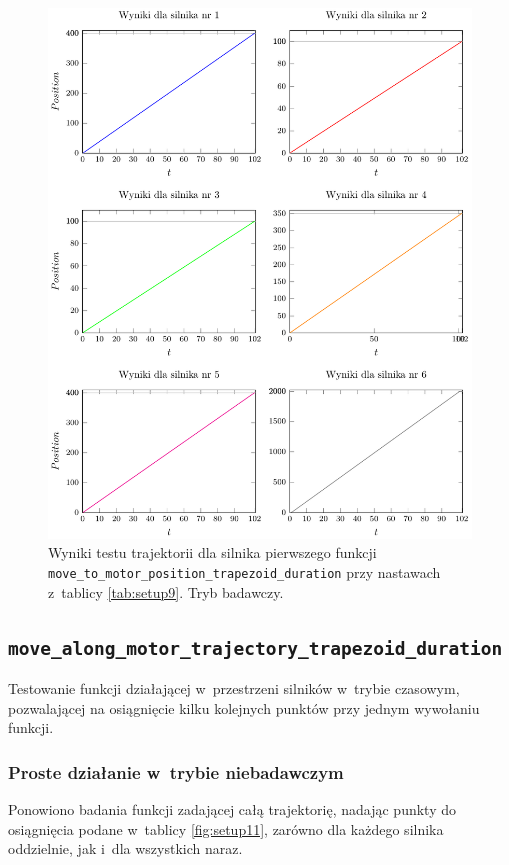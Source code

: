 \documentclass[a4paper, 12pt]{article}
\begin{document}
	\begin{figure}[H]
		\centering
		\includegraphics[scale=1.1]{raport_graphs/simpMPDRall.pdf}
		\caption{Wyniki testu trajektorii dla silnika pierwszego funkcji \texttt{move\_to\_motor\_position\_trapezoid\_duration} przy nastawach z~tablicy \ref{tab:setup9}. Tryb badawczy.}
		\label{fig:simpMPDRall}
	\end{figure}	
	
	\subsection{\texttt{move\_along\_motor\_trajectory\_trapezoid\_duration}}
	
	Testowanie funkcji działającej w~przestrzeni silników w~trybie czasowym, pozwalającej na osiągnięcie kilku kolejnych punktów przy jednym wywołaniu funkcji. 

	\subsubsection{Proste działanie w~trybie niebadawczym}
	Ponowiono badania funkcji zadającej całą trajektorię, nadając punkty do osiągnięcia podane w~tablicy \ref{fig:setup11}, zarówno dla każdego silnika oddzielnie, jak i~dla wszystkich naraz.
	
\end{document}
